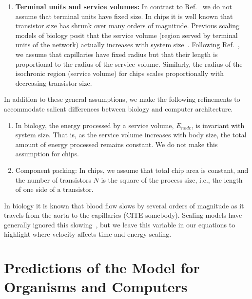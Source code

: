 \documentclass[12pt]{article}
\begin{document}
\begin{enumerate}
\item {\bf Terminal units and service volumes:} In contrast to
  Ref.~\cite{west97} we do not assume that terminal units have fixed size.   In
  chips it is well known that transistor size has shrunk over many orders of
  magnitude.   Previous scaling models of biology posit that the service volume
  (region served by terminal units of the network) actually increases with
  system size~\cite{west97,banavar10}.  Following Ref.~\cite{banavar10}, we
  assume that capillaries have fixed radius but that their length is
  proportional to the radius of the service volume.   Similarly, the radius of
  the isochronic region (service volume) for chips scales proportionally with
  decreasing transistor size.
\end{enumerate}

In addition to these general assumptions, we make the following
refinements to accommodate salient differences between biology and computer architecture.
\begin{enumerate}
\item In biology, the energy processed by a service volume,
  $E_{node}$, is invariant with system size. That is, as the service volume
  increases with body size, the total amount of energy processed
  remains constant.   We do not make this assumption for chips.

\item Component packing: In chips, we assume that total chip area is constant, and the
  number of transistors $N$ is the square of the process size, i.e.,
  the length of one side of a transistor. 

\end{enumerate}

\noindent 

In biology it is known that blood flow slows by several orders of magnitude as it travels from the aorta to the capillaries (CITE somebody). Scaling models have generally ignored this slowing~\cite{west97, banavar10}, but we leave this variable in our equations to highlight where velocity affects time and energy scaling.

\section{Predictions of the Model for Organisms and Computers}
\end{document}
